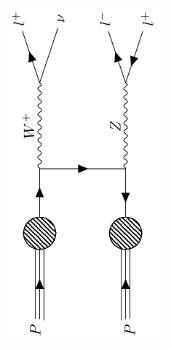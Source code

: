 \begin{figure}
{\begin{subfigure}{.5\textwidth}
            \includegraphics[width=0.45\textwidth, angle = -90]{Figures/FDiagrams/wz.png}
            \caption{}
            \label{fig:wz}
        \end{subfigure}
    }
    \\
    \newline
\end{figure}
